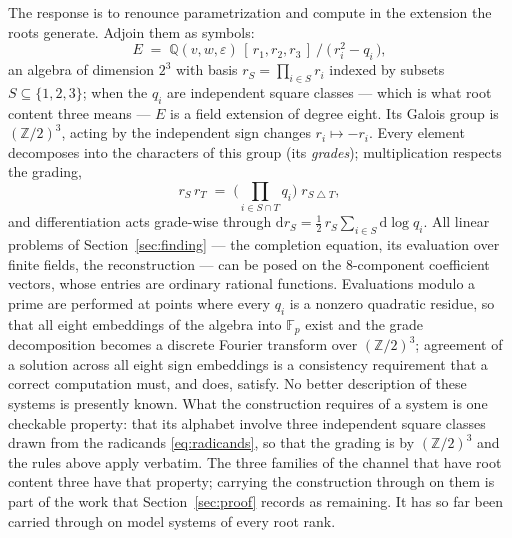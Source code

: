\documentclass[11pt]{article}
\newcommand{\eps}{\varepsilon}
\newcommand{\dd}{\mathrm{d}}
\newcommand{\Q}{\mathbb{Q}}
\newcommand{\Z}{\mathbb{Z}}
\newcommand{\Fp}{\mathbb{F}_p}
\begin{document}
The response is to renounce parametrization and compute in the
extension the roots generate.  Adjoin them as symbols:
\begin{equation}
  E \;=\; \Q(v,w,\eps)\,[\,r_1,r_2,r_3\,]\ \big/\
  \big(\,r_i^2 - q_i\,\big) ,
\end{equation}
an algebra of dimension $2^3$ with basis
$r_S = \prod_{i\in S} r_i$ indexed by subsets
$S \subseteq \{1,2,3\}$; when the $q_i$ are independent square
classes --- which is what root content three means --- $E$ is a
field extension of degree eight.  Its Galois group is $(\Z/2)^3$,
acting by the independent sign changes $r_i \mapsto -r_i$.  Every
element decomposes into the characters of this group (its
\emph{grades}); multiplication respects the grading,
\begin{equation}
  r_S\, r_T \;=\; \Big(\prod_{i \in S\cap T} q_i\Big)\;
  r_{S \mathbin{\triangle} T} ,
\end{equation}
and differentiation acts grade-wise through
$\dd r_S = \tfrac12\, r_S \sum_{i\in S} \dd\log q_i$.  All linear
problems of Section~\ref{sec:finding} --- the completion equation,
its evaluation over finite fields, the reconstruction --- can be
posed on the $8$-component coefficient vectors, whose entries are
ordinary rational functions.  Evaluations modulo a prime are
performed at points where every $q_i$ is a nonzero quadratic
residue, so that all eight embeddings of the algebra into $\Fp$
exist and the grade decomposition becomes a discrete Fourier
transform over $(\Z/2)^3$; agreement of a solution across all eight
sign embeddings is a consistency requirement that a correct
computation must, and does, satisfy.  No better description of these
systems is presently known.  What the construction requires of a
system is one checkable property: that its alphabet involve three
independent square classes drawn from the radicands
\eqref{eq:radicands}, so that the grading is by $(\Z/2)^3$ and the
rules above apply verbatim.  The three families of the channel that
have root content three have that property; carrying the construction
through on them is part of the work that Section~\ref{sec:proof}
records as remaining.  It has so far been carried through on model
systems of every root rank.
\end{document}
